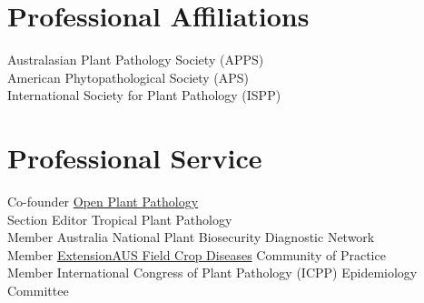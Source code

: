 
\section*{Professional Affiliations}
  Australasian Plant Pathology Society (APPS)\\[3 mm]
  American Phytopathological Society (APS)\\[3 mm]
  International Society for Plant Pathology (ISPP)\\

\section*{Professional Service}
  Co-founder \href{https://www.openplantpathology.org}{Open Plant Pathology}\\[3 mm]
  Section Editor Tropical Plant Pathology\\[3 mm]
  Member Australia National Plant Biosecurity Diagnostic Network\\[3 mm]
  Member \href{http://extensionaus.com.au/field-crop-diseases/}{ExtensionAUS Field Crop Diseases} Community of Practice\\[3 mm]
  Member International Congress of Plant Pathology (ICPP) Epidemiology Committee\\
